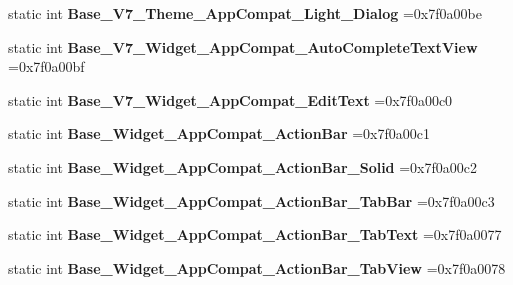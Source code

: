 \begin{DoxyCompactItemize}
static int {\bfseries Base\+\_\+\+V7\+\_\+\+Theme\+\_\+\+App\+Compat\+\_\+\+Light\+\_\+\+Dialog} =0x7f0a00be
\item 
\mbox{\label{classandroid_1_1support_1_1design_1_1R_1_1style_a49279a3b28976d7c410094ff56c6bb3d}} 
static int {\bfseries Base\+\_\+\+V7\+\_\+\+Widget\+\_\+\+App\+Compat\+\_\+\+Auto\+Complete\+Text\+View} =0x7f0a00bf
\item 
\mbox{\label{classandroid_1_1support_1_1design_1_1R_1_1style_a2bf8c388b877627a16b3043f7102dd2a}} 
static int {\bfseries Base\+\_\+\+V7\+\_\+\+Widget\+\_\+\+App\+Compat\+\_\+\+Edit\+Text} =0x7f0a00c0
\item 
\mbox{\label{classandroid_1_1support_1_1design_1_1R_1_1style_a973f19082b6f678edc3e95a8ce1ef29c}} 
static int {\bfseries Base\+\_\+\+Widget\+\_\+\+App\+Compat\+\_\+\+Action\+Bar} =0x7f0a00c1
\item 
\mbox{\label{classandroid_1_1support_1_1design_1_1R_1_1style_a0ffd2e751808970a21d571b75a74feb9}} 
static int {\bfseries Base\+\_\+\+Widget\+\_\+\+App\+Compat\+\_\+\+Action\+Bar\+\_\+\+Solid} =0x7f0a00c2
\item 
\mbox{\label{classandroid_1_1support_1_1design_1_1R_1_1style_ae377f71008c53a11a4ed9fba4e18a59c}} 
static int {\bfseries Base\+\_\+\+Widget\+\_\+\+App\+Compat\+\_\+\+Action\+Bar\+\_\+\+Tab\+Bar} =0x7f0a00c3
\item 
\mbox{\label{classandroid_1_1support_1_1design_1_1R_1_1style_a9d2d21932244ecbc51d0cbce8dd9a579}} 
static int {\bfseries Base\+\_\+\+Widget\+\_\+\+App\+Compat\+\_\+\+Action\+Bar\+\_\+\+Tab\+Text} =0x7f0a0077
\item 
\mbox{\label{classandroid_1_1support_1_1design_1_1R_1_1style_a72d7e88311a4aef854c2123a87ca2c5a}} 
static int {\bfseries Base\+\_\+\+Widget\+\_\+\+App\+Compat\+\_\+\+Action\+Bar\+\_\+\+Tab\+View} =0x7f0a0078
\item 
\mbox{\label{classandroid_1_1support_1_1design_1_1R_1_1style_a8a6e341cbe86e8f31c4773b299497ed2}} 

\end{DoxyCompactItemize}
